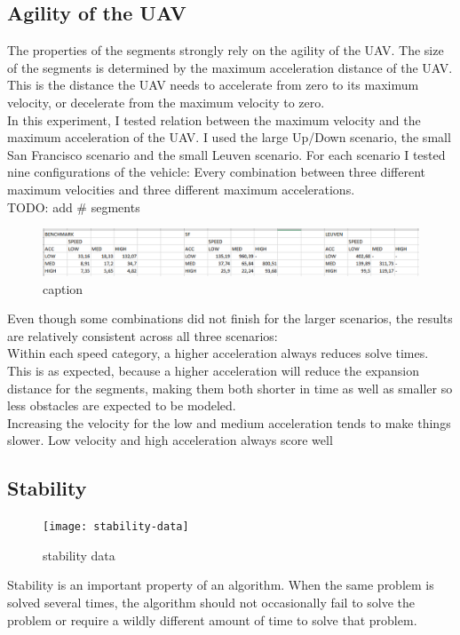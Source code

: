 \clearpage
\subsection{Agility of the UAV}
\label{subsec:agility}
The properties of the segments strongly rely on the agility of the UAV. The size of the segments is determined by the maximum acceleration distance of the UAV. This is the distance the UAV needs to accelerate from zero to its maximum velocity, or decelerate from the maximum velocity to zero. \\
In this experiment, I tested relation between the maximum velocity and the maximum acceleration of the UAV. I used the large Up/Down scenario, the small San Francisco scenario and the small Leuven scenario. For each scenario I tested nine configurations of the vehicle: Every combination between three different maximum velocities and three different maximum accelerations.\\
TODO: add \# segments

\begin{figure}
\includegraphics[width=\textwidth]{img/agility1}
caption{}
\label{fig:agility-times}
\end{figure}
Even though some combinations did not finish for the larger scenarios, the results are relatively consistent across all three scenarios:\\
Within each speed category, a higher acceleration always reduces solve times. This is as expected, because a higher acceleration will reduce the expansion distance for the segments, making them both shorter in time as well as smaller so less obstacles are expected to be modeled.\\
Increasing the velocity for the low and medium acceleration tends to make things slower.
Low velocity and high acceleration always score well





\clearpage
\subsection{Stability}
\label{subsec:stability}
\begin{figure}[]
	\centering
	\texttt{[image: stability-data]}
	\caption{stability data}
	\label{fig:stability-data}
\end{figure}
Stability is an important property of an algorithm. When the same problem is solved several times, the algorithm should not occasionally fail to solve the problem or require a wildly different amount of time to solve that problem. \\

